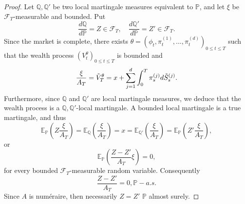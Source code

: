 \begin{proof}
    Let $\mathbb{Q},\mathbb{Q}'$ be two local martingale measures equivalent to $\mathbb{P}$, and let $\xi$ be $\mathcal{F}_T$-measurable and bounded. Put
    \begin{equation}
        \frac{d\mathbb{Q}}{d\mathbb{P}}=Z\in\mathcal{F}_{T},\quad \frac{d\mathbb{Q}'}{d\mathbb{P}}=Z' \in \mathcal{F}_{T}.
    \end{equation}
    Since the market is complete, there exists $\theta = (\phi_{t},\pi_{t}^{(1)},\dots,\pi_{t}^{(d)})_{0\leq t\leq T}$ such that the wealth process $(V_{t}^{\theta})_{0\leq t\leq T}$ is bounded and
    \begin{equation}
        \frac{\xi}{A_{T}}=\Tilde{V}_{T}^{\theta}=x+\sum_{j=1}^{d}\int_{0}^{T}\pi_{s}^{(j)}d\Tilde{S}_{s}^{(j)}.
    \end{equation}
    Furthermore, since $\mathbb{Q}$ and $\mathbb{Q}'$ are local martingale measures, we deduce that the wealth process is a $\mathbb{Q},\mathbb{Q}'$-local martingale. A bounded local martingale is a true martingale, and thus
    \begin{equation}
        \mathbb{E}_{\mathbb{P}}\left(Z\frac{\xi}{A_T}\right)=\mathbb{E}_{\mathbb{Q}}\left(\frac{\xi}{A_T}\right)=x=\mathbb{E}_{\mathbb{Q}'}\left(\frac{\xi}{A_T}\right)=\mathbb{E}_{\mathbb{P}}\left(Z'\frac{\xi}{A_T}\right),
    \end{equation}
    or 
    \begin{equation}
        \mathbb{E}_{\mathbb{P}}\left(\frac{Z-Z'}{A_T}\xi\right)=0,
    \end{equation}
    for every bounded $\mathcal{F}_T$-measurable random variable. Consequently
    \begin{equation}
        \frac{Z-Z'}{A_T}=0, \mathbb{P}-a.s.
    \end{equation}
Since $A$ is numéraire, then necessarily $Z=Z'$ $\mathbb{P}$ almost surely.
\end{proof}